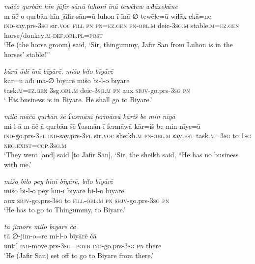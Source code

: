 \ea \label{ŠJ.71}
\textit{māčo qurbān hīn jāfir sānū luhonī īnā tewēɫew wiɫāxekāne} \\ 
\gll m-āč-o qurbān hīn jāfir sān=ū luhon-ī īnā-∅ tewēɫe=ū wiɫāx-ekā=ne \\ 
 \textsc{ind-}say.prs\textsc{-3sg} sir.\textsc{voc} \textsc{fill} \textsc{pn} \textsc{pn}\textsc{=ez.gen} \textsc{pn}\textsc{-obl}\textsc{.m} deic\textsc{-3sg}\textsc{.m} stable\textsc{.m}\textsc{=ez.gen} horse/donkey\textsc{.m}\textsc{-def}\textsc{.obl}\textsc{.pl}\textsc{=\textsc{post}} \\ 
\glt `He (the horse groom) said, ‘Sir, thingummy, Jafir Sān from Luhon is in the horses’ stable!’'
\z 
 
\ea \label{ŠJ.75}
\textit{kārū āđī īnā bīyārē, mišo bilo bīyārē} \\ 
\gll kār=ū āđī īnā-∅ bīyārē mišo bi-l-o bīyārē \\ 
 task\textsc{.m}\textsc{=ez.gen} 3sg\textsc{.obl}\textsc{.m} deic\textsc{-3sg}\textsc{.m} \textsc{pn} aux \textsc{sbjv-}go.prs\textsc{-3sg} \textsc{pn} \\ 
\glt ` His business is in Biyare. He shall go to Biyare.'
\z 
 
\ea \label{ŠJ.77}
\textit{milā māčā qurbān šē ʕusmānī fermāwā kāriš be min nīyā} \\ 
\gll mi-l-ā m-āč-ā qurbān šē ʕusmān-ī fermāwā kār=iš be min nīye=ā \\ 
 \textsc{ind-}go.prs\textsc{-3pl} \textsc{ind-}say.prs\textsc{-3pl} sir.\textsc{voc} sheikh\textsc{.m} \textsc{pn}\textsc{-obl}\textsc{.m} say\textsc{.pst} task\textsc{.m}\textsc{=3sg} to \textsc{1sg} \textsc{\textsc{neg.}exist}\textsc{=cop}\textsc{.3sg}\textsc{.m} \\ 
\glt `They went [and] said [to Jafir Sān], ‘Sir, the sheikh said, “He has no business with me.'
\z 
 
\ea \label{ŠJ.78}
\textit{mišo bilo pey hīnī bīyārē, bilo bīyārē} \\ 
\gll mišo bi-l-o pey hīn-ī bīyārē bi-l-o bīyārē \\ 
 aux \textsc{sbjv-}go.prs\textsc{-3sg} to \textsc{fill}\textsc{-obl}\textsc{.m} \textsc{pn} \textsc{sbjv-}go.prs\textsc{-3sg} \textsc{pn} \\ 
\glt `He has to go to Thingummy, to Biyare.'
\z 
 
\ea \label{ŠJ.80}
\textit{tā jimore milo bīyārē čā} \\ 
\gll tā ∅-jim-o=re mi-l-o bīyārē čā \\ 
 until \textsc{ind-}move.prs\textsc{-3sg}\textsc{=\textsc{povb}} \textsc{ind-}go.prs\textsc{-3sg} \textsc{pn} there \\ 
\glt `He (Jafir Sān) set off to go to Biyare from there.'
\z 
 
